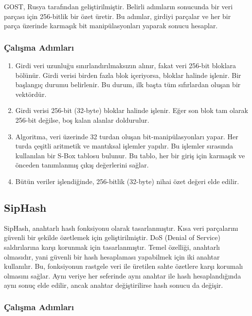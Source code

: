 GOST, Rusya tarafından geliştirilmiştir. Belirli adımların sonucunda bir veri parçası için 256-bitlik bir özet üretir. Bu adımlar, girdiyi parçalar ve her bir parça üzerinde karmaşık bit manipülasyonları yaparak sonucu hesaplar.

\subsubsection{Çalışma Adımları}

\begin{enumerate}
    \item Girdi veri uzunluğu sınırlandırılmaksızın alınır, fakat veri 256-bit bloklara bölünür. Girdi verisi birden fazla blok içeriyorsa, bloklar halinde işlenir. Bir başlangıç durumu belirlenir. Bu durum, ilk başta tüm sıfırlardan oluşan bir vektördür.
    \item Girdi verisi 256-bit (32-byte) bloklar halinde işlenir. Eğer son blok tam olarak 256-bit değilse, boş kalan alanlar doldurulur.
    \item Algoritma, veri üzerinde 32 turdan oluşan bit-manipülasyonları yapar. Her turda çeşitli aritmetik ve mantıksal işlemler yapılır. Bu işlemler sırasında kullanılan bir S-Box tablosu bulunur. Bu tablo, her bir giriş için karmaşık ve önceden tanımlanmış çıkış değerlerini sağlar.
    \item Bütün veriler işlendiğinde, 256-bitlik (32-byte) nihai özet değeri elde edilir.
\end{enumerate}

\newpage

\subsection{SipHash}

SipHash, anahtarlı hash fonksiyonu olarak tasarlanmıştır. Kısa veri parçalarını güvenli bir şekilde özetlemek için geliştirilmiştir. DoS (Denial of Service) saldırılarına karşı korunmak için tasarlanmıştır. Temel özelliği, anahtarlı olmasıdır, yani güvenli bir hash hesaplaması yapabilmek için iki anahtar kullanılır. Bu, fonksiyonun rastgele veri ile üretilen sahte özetlere karşı korumalı olmasını sağlar. Aynı veriye her seferinde aynı anahtar ile hash hesaplandığında aynı sonuç elde edilir, ancak anahtar değiştirilirse hash sonucu da değişir.

\subsubsection{Çalışma Adımları}


